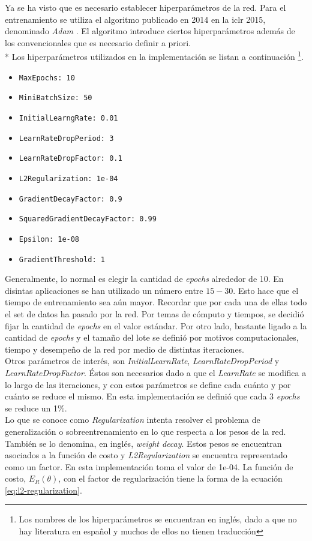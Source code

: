 \indent Ya se ha visto que es necesario establecer hiperparámetros de la red. Para el entrenamiento se utiliza el
algoritmo publicado en 2014 en la \acrshort{iclr} 2015, denominado \textit{Adam} \cite{pp:adam}. El algoritmo
introduce ciertos hiperparámetros además de los convencionales que es necesario definir a priori. \\*
\indent Los hiperparámetros utilizados en la implementación se listan a continuación \footnote{Los nombres de los
hiperparámetros se encuentran en inglés, dado a que no hay literatura en español y muchos de ellos no tienen
traducción}.

\begin{itemize}
  \item \texttt{MaxEpochs: 10}
  \item \texttt{MiniBatchSize: 50}
  \item \texttt{InitialLearngRate: 0.01}
  \item \texttt{LearnRateDropPeriod: 3}
  \item \texttt{LearnRateDropFactor: 0.1}
  \item \texttt{L2Regularization: 1e-04}
  \item \texttt{GradientDecayFactor: 0.9}
  \item \texttt{SquaredGradientDecayFactor: 0.99}
  \item \texttt{Epsilon: 1e-08}
  \item \texttt{GradientThreshold: 1}
\end{itemize}

\indent Generalmente, lo normal es elegir la cantidad de \textit{epochs} alrededor de 10. En disintas aplicaciones
se han utilizado un número entre $15-30$. Esto hace que el tiempo de entrenamiento sea aún mayor. Recordar que por
cada una de ellas todo el set de datos ha pasado por la red. Por temas de cómputo y tiempos, se decidió fijar la
cantidad de \textit{epochs} en el valor estándar. Por otro lado, bastante ligado a la cantidad de \textit{epochs} y
el tamaño del lote se definió por motivos computacionales, tiempo y desempeño de la red por medio de distintas
iteraciones. \\
\indent Otros parámetros de interés, son \textit{InitialLearnRate}, \textit{LearnRateDropPeriod} y
\textit{LearnRateDropFactor}. Éstos son necesarios dado a que el \textit{LearnRate} se modifica a lo largo de las
iteraciones, y con estos parámetros se define cada cuánto y por cuánto se reduce el mismo. En esta implementación se
definió que cada 3 \textit{epochs} se reduce un 1\%. \\
\indent Lo que se conoce como \textit{Regularization} intenta resolver el problema de generalización o
sobreentrenamiento en lo que respecta a los pesos de la red. También se lo denomina, en inglés, \textit{weight
decay}. Estos pesos se encuentran asociados a la función de costo y \textit{L2Regularization} se encuentra
representado como un factor. En esta implementación toma el valor de 1e-04. La función de costo, $E_R(\theta)$, con
el factor de regularización tiene la forma de la ecuación \ref{eq:l2-regularization}.

